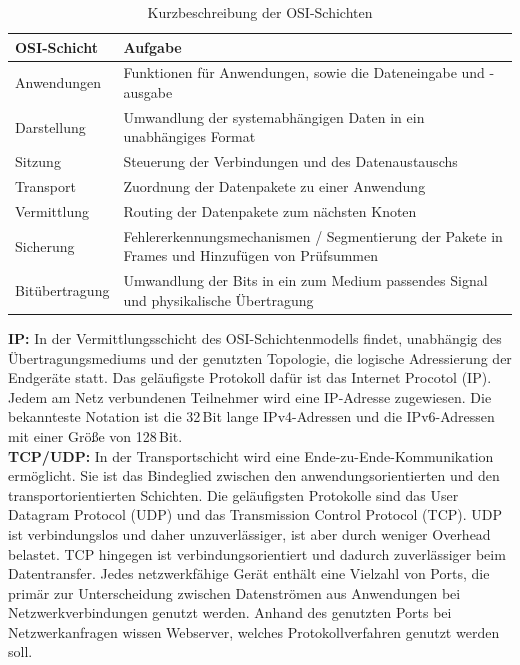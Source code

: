 \newpage

\begin{table}[tbt]
\caption[Kurzbeschreibung der OSI-Schichten]{Kurzbeschreibung der OSI-Schichten \cite{ekOSI}}
\label{tab:OSISchichtenbeschreibung}
\begin{center}
    \begin{tabular}{ l  p{8cm} }
    \toprule
     OSI-Schicht & Aufgabe \\ 
     \midrule
        
    Anwendungen & Funktionen für Anwendungen, sowie die Dateneingabe und -ausgabe \\

    Darstellung & Umwandlung der systemabhängigen Daten in ein unabhängiges Format  \\

    Sitzung & Steuerung der Verbindungen und des Datenaustauschs  \\

    Transport & Zuordnung der Datenpakete zu einer Anwendung \\
    
	Vermittlung & Routing der Datenpakete zum nächsten Knoten \\
	
	Sicherung & Fehlererkennungsmechanismen / Segmentierung der Pakete in Frames und Hinzufügen von Prüfsummen  \\
    
    Bitübertragung & Umwandlung der Bits in ein zum Medium passendes Signal und physikalische Übertragung\\ 
    \bottomrule
    \end{tabular}
\end{center}
\end{table}

\noindent
{}
\textbf{IP:}
In der Vermittlungsschicht des OSI-Schichtenmodells findet, unabhängig des Über\-tra\-gungs\-mediums und der genutzten Topologie, die logische Adressierung der Endgeräte statt. Das geläufigste Protokoll dafür ist das Internet Procotol (IP). Jedem am Netz verbundenen Teilnehmer wird eine IP-Adresse zugewiesen. Die bekannteste Notation ist die 32\,Bit lange IPv4-Adressen und die IPv6-Adressen mit einer Größe von 128\,Bit.\\

\noindent
{}
\textbf{TCP/UDP:}
In der Transportschicht wird eine Ende-zu-Ende-Kommunikation ermöglicht. 
Sie ist das Bindeglied zwischen den anwendungsorientierten und den transportorientierten Schichten. 
Die geläufigsten Protokolle sind das User Datagram Protocol (UDP) und das Transmission Control Protocol (TCP).
UDP ist verbindungslos und daher unzuverlässiger, ist aber durch weniger Overhead belastet.
TCP hingegen ist verbindungsorientiert und dadurch zuverlässiger beim Datentransfer.
Jedes netzwerkfähige Gerät enthält eine Vielzahl von Ports, die primär zur
Unterscheidung zwischen Datenströmen aus Anwendungen bei Netzwerkverbindungen
genutzt werden. Anhand des genutzten Ports bei Netzwerkanfragen
wissen Webserver, welches Protokollverfahren genutzt werden soll.

